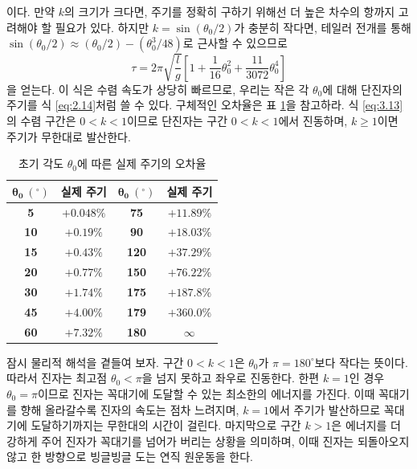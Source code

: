 \documentclass[chapter, oneside, b5paper]{oblivoir}
\theoremstyle{plain}
\theoremstyle{definition}
\theoremstyle{remark}
\begin{document}
이다. 만약 $k$의 크기가 크다면, 주기를 정확히 구하기 위해선 더 높은 차수의 항까지 고려해야 할 필요가 있다. 하지만 $k=\sin{(\theta_0 / 2)}$가 충분히 작다면, 테일러 전개를 통해 $\sin{(\theta_0/2)} \approx (\theta_0/2) - (\theta_0^3/48)$로 근사할 수 있으므로
\begin{equation}
    \tau = 2\pi \sqrt{\frac{l}{g}} \left[1+\frac{1}{16}\theta_0^2 + \frac{11}{3072}\theta_0^4 \right]
    \label{eq:3.15}
\end{equation}
을 얻는다. 이 식은 수렴 속도가 상당히 빠르므로, 우리는 작은 각 $\theta_0$에 대해 단진자의 주기를 식 \ref{eq:2.14}처럼 쓸 수 있다. 구체적인 오차율은 표 \ref{table:3.1}을 참고하라. 식 \ref{eq:3.13}의 수렴 구간은 $0 < k < 1$이므로 단진자는 구간 $0 < k < 1$에서 진동하며, $k \geq 1$이면 주기가 무한대로 발산한다.

\begin{table}[htbp]
\centering
\caption{초기 각도 $\theta_0$에 따른 실제 주기의 오차율}
\label{tab:pendulum_period}
\vspace{0.5em} %
\begin{tabular}{cccc}
    \toprule
    $\boldsymbol{\theta_0\ (^\circ)}$ & \textbf{실제 주기} & $\boldsymbol{\theta_0\ (^\circ)}$ & \textbf{실제 주기} \\
    \midrule
    \textbf{5}   & $+0.048\%$ & \textbf{75}  & $+11.89\%$ \\
    \textbf{10}  & $+0.19\%$  & \textbf{90}  & $+18.03\%$ \\
    \textbf{15}  & $+0.43\%$  & \textbf{120} & $+37.29\%$ \\
    \textbf{20}  & $+0.77\%$  & \textbf{150} & $+76.22\%$ \\
    \textbf{30}  & $+1.74\%$  & \textbf{175} & $+187.8\%$ \\
    \textbf{45}  & $+4.00\%$  & \textbf{179} & $+360.0\%$ \\
    \textbf{60}  & $+7.32\%$  & \textbf{180} & $\infty$    \\
    \bottomrule
\end{tabular}
\label{table:3.1}
\end{table}

잠시 물리적 해석을 곁들여 보자. 구간 $0 <k < 1$은 $\theta_0$가 $\pi=180^\circ$보다 작다는 뜻이다. 따라서 진자는 최고점 $\theta_0 < \pi$을 넘지 못하고 좌우로 진동한다. 한편 $k=1$인 경우 $\theta_0 = \pi$이므로 진자는 꼭대기에 도달할 수 있는 최소한의 에너지를 가진다. 이때 꼭대기를 향해 올라갈수록 진자의 속도는 점차 느려지며, $k=1$에서 주기가 발산하므로 꼭대기에 도달하기까지는 무한대의 시간이 걸린다. 마지막으로 구간 $k > 1$은 에너지를 더 강하게 주어 진자가 꼭대기를 넘어가 버리는 상황을 의미하며, 이때 진자는 되돌아오지 않고 한 방향으로 빙글빙글 도는 연직 원운동을 한다.
\end{document}
